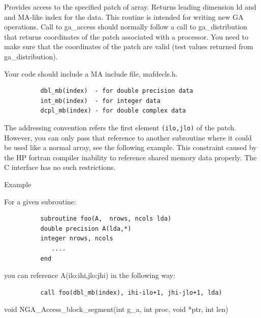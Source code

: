 \documentclass[12pt]{article}
\begin{document}
\begin{fdesc}

  Provides access to the specified patch of array. Returns leading
  dimension ld and and MA-like index for the data. This routine is
  intended for writing new GA operations. Call to ga_access should
  normally follow a call to ga_distribution that returns coordinates
  of the patch associated with a processor. You need to make sure that
  the coordinates of the patch are valid (test values returned from
  ga_distribution).

Your code should include a MA include file, mafdecls.h. 
\begin{verbatim}       
          dbl_mb(index)  - for double precision data
          int_mb(index)  - for integer data
          dcpl_mb(index) - for double complex data
\end{verbatim}

The addressing convention refers the first element \verb|(ilo,jlo)|
of the patch. However, you can only pass that reference to another
subroutine where it could be used like a normal array, see the
following example. This constraint caused by the HP fortran compiler
inability to reference shared memory data properly. The C interface
has no such restrictions.

Example

For a given subroutine:
\begin{verbatim}
          subroutine foo(A,  nrows, ncols lda)
          double precision A(lda,*)
          integer nrows, ncols
             ....
          end
\end{verbatim}
you can reference A(ilo:ihi,jlo:jhi) in the following way:

\begin{verbatim}
          call foo(dbl_mb(index), ihi-ilo+1, jhi-jlo+1, lda)
\end{verbatim}
\end{fdesc}



\begin{capi}
\begin{ccode}
void NGA_Access_block_segment(int g_a, int proc, void *ptr, int len)
\end{ccode}
\begin{funcargs}
\end{funcargs}
\end{capi}
\end{document}
